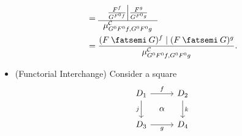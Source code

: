 \documentclass[DynamicalBook]{subfiles}
\begin{document}
\begin{itemize}
\begin{align*}
                                                       &= {\begin{tabular}{c} $\left. \frac{F^f}{G^{F^0f}} \middle| \frac{F^g}{G^{F^0 g}} \right.$ \\  \hline $\mu^{\cat{C}}_{G^0F^0f, G^0F^0g}$   \end{tabular}} \\
    &= \frac{(F\then G)^f \mid (F \then G)^g}{\mu^{\cat{C}}_{G^0F^0f, G^0F^0g}}.
  \end{align*}
\item (Functorial Interchange) Consider a square
\[
\begin{tikzcd}[sep=tiny]
D_1 \ar[rr, "f"] \ar[dd, "j"'] & & D_2 \ar[dd, "k"] \\
 & \alpha & \\
D_3 \ar[rr, "g"'] & & D_4
\end{tikzcd}
\]


\end{itemize}
\end{document}
